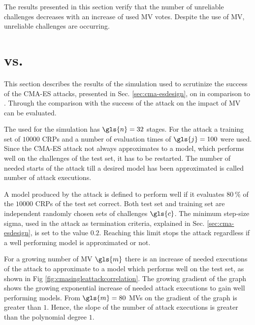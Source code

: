 The results presented in this section verify that the number of unreliable challenges decreases with an increase of used \ac{MV} votes.
Despite the use of \ac{MV}, unreliable challenges are occurring.


\section{\apufs vs. \mpufs}
\label{sec:arbitervsmajorityarbiter}

This section describes the results of the simulation used to scrutinize the success of the \ac{CMA-ES} attacks, presented in Sec. \ref{sec:cma-esdesign}, on \mpufs in comparison to \apufs.
Through the comparison with the success of the attack on \apuf the impact of \ac{MV} can be evaluated.

The \apuf used for the simulation has $\gls{n} = 32$ stages.
For the attack a training set of $10000$ \acp{CRP} and a number of evaluation times of $\gls{j} = 100$ were used.
Since the \ac{CMA-ES} attack not always approximates to a model, which performs well on the challenges of the test set, it has to be restarted.
The number of needed starts of the attack till a desired model has been approximated is called number of attack executions.

A model produced by the attack is defined to perform well if it evaluates $80\ \%$ of the $10000$ \acp{CRP} of the test set correct.
Both test set and training set are independent randomly chosen sets of challenges $\gls{c}$.
The minimum step-size sigma, used in the attack as termination criteria, explained in Sec. \ref{sec:cma-esdesign}, is set to the value $0.2$.
Reaching this limit stops the attack regardless if a well performing model is approximated or not.

For a growing number of \ac{MV} $\gls{m}$ there is an increase of needed executions of the attack to approximate to a model which performs well on the test set, as shown in Fig \ref{fig:cmasingleattackcorrelation}.
The growing gradient of the graph shows the growing exponential increase of needed attack executions to gain well performing models.
From $\gls{m} = 80$ \acp{MV} on the gradient of the graph is greater than $1$.
Hence, the slope of the number of attack executions is greater than the polynomial degree $1$.

